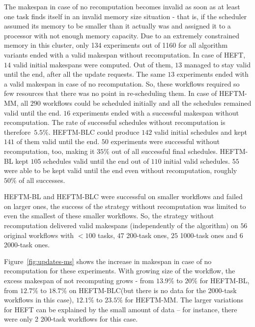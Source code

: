 \documentclass[conference]{IEEEtran}
\newcommand{\algo}[1]{\textsc{#1}}
\newcommand{\heft}{\algo{HEFT}\xspace}
\newcommand{\heftmm}{\algo{HEFTM-MM}\xspace}
\newcommand{\heftbl}{\algo{HEFTM-BL}\xspace}
\newcommand{\heftblc}{\algo{HEFTM-BLC}\xspace}
\newcommand{\AB}[1]{{\color{purple}[AB: #1]}}
\begin{document}
%
    The makespan in case of no recomputation becomes invalid as soon as at least one task finds itself in an invalid memory size
    situation - that is, if the scheduler assumed its memory to be smaller than it actually was and assigned it to a processor
    with not enough memory capacity.
    Due to an extremely constrained memory in this cluster, only 134 experiments out of 1160 for all algorithm variants
    ended with a valid makespan without recomputation.
    In case of \heft, $14$ valid initial makespans were computed.
    Out of them, $13$ managed to stay valid until the end, after all the update requests.
    The same $13$ experiments ended with a valid makespan in case of no recomputation.
    So, these workflows required so few resources that there was no point in re-scheduling them.
    In case of \heftmm, all $290$ workflows could be scheduled initially and all the schedules remained valid until the end.
    $16$ experiments ended with a successful makespan without recomputation.
    The rate of successful schedules without recomputation is therefore~$5.5\%$.
    \heftblc could produce $142$ valid initial schedules and kept $141$ of them valid until the end.
    $50$ experiments were successful without recomputation, too, making it $35\%$ out of all successful final schedules.
    \heftbl kept $105$ schedules valid until the end out of $110$ initial valid schedules.
    $55$ were able to be kept valid until the end even without recomputation, roughly $50\%$ of all successes.

    \heftbl and \heftblc were successful on smaller workflows and failed on larger ones, the success of the strategy without
    recomputation was limited to even the smallest of these smaller workflows.
    So, the strategy without recomputation delivered valid makespans (independently of the algorithm) on $56$ original
    workflows with $<100$ tasks, $47$ 200-task ones, $25$ 1000-task ones and $6$ 2000-task ones.

    Figure~\ref{fig:updates-ms} shows the increase in makespan in case of no recomputation for these experiments.
    With growing size of the workflow, the excess makespan of not recomputing grows - from $13.9\%$ to $20\%$ for \heftbl,
    from $12.7\%$ to $18.7\%$ on \heftblc (but there is no data for the 2000-task workflows in this case),
    $12.1\%$ to $23.5\%$ for \heftmm.
    The larger variations for \heft can be explained by the small amount of data -- for instance, there were only 2 200-task
    workflows for this case.
\end{document}
